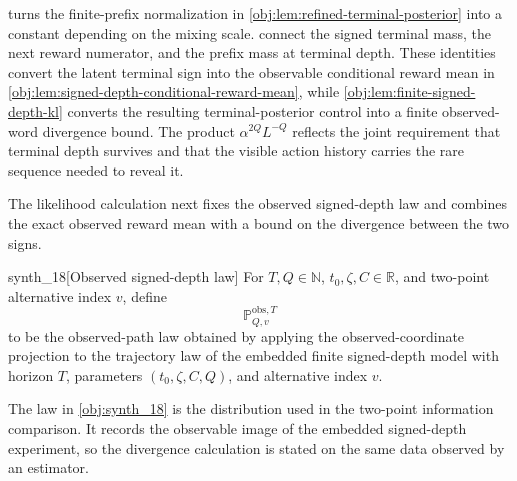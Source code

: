  turns the finite-prefix normalization in \cref{obj:lem:refined-terminal-posterior} into a constant depending on the mixing scale.  connect the signed terminal mass, the next reward numerator, and the prefix mass at terminal depth. These identities convert the latent terminal sign into the observable conditional reward mean in \cref{obj:lem:signed-depth-conditional-reward-mean}, while \cref{obj:lem:finite-signed-depth-kl} converts the resulting terminal-posterior control into a finite observed-word divergence bound. The product \(\alpha^{2Q}L^{-Q}\) reflects the joint requirement that terminal depth survives and that the visible action history carries the rare sequence needed to reveal it.

The likelihood calculation next fixes the observed signed-depth law and combines the exact observed reward mean with a bound on the divergence between the two signs.

\begin{definitionv}{synth_18}[Observed signed-depth law]
For \(T,Q\in\mathbb N\), \(t_0,\zeta,C\in\mathbb R\), and two-point alternative index \(v\), define
\[
\mathbb P_{Q,v}^{\mathrm{obs},T}
\]
to be the observed-path law obtained by applying the observed-coordinate projection to the trajectory law of the embedded finite signed-depth model with horizon \(T\), parameters \((t_0,\zeta,C,Q)\), and alternative index \(v\).
\end{definitionv}

The law in \cref{obj:synth_18} is the distribution used in the two-point information comparison. It records the observable image of the embedded signed-depth experiment, so the divergence calculation is stated on the same data observed by an estimator.

